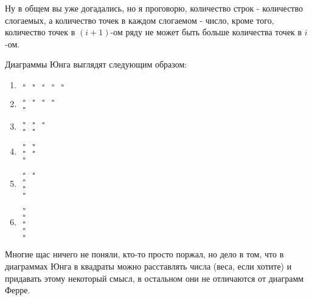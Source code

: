 Ну в общем вы уже догадались, но я проговорю, количество строк - количество слогаемых, а количество точек в каждом слогаемом - число, кроме того, количество точек в $\left(i+1\right)$-ом ряду не может быть больше количества точек в $i$-ом.

Диаграммы Юнга выглядят следующим образом:

\begin{enumerate}
\item $\begin{matrix}
	\square & \square & \square & \square & \square
	\end{matrix}$

\item $\begin{matrix}
	\square & \square & \square & \square \\
	\square
	\end{matrix}$

\item $\begin{matrix}
	\square & \square & \square \\
	\square & \square
	\end{matrix}$

\item $\begin{matrix}
	\square & \square \\
	\square & \square \\
	\square
	\end{matrix}$

\item $\begin{matrix}
	\square & \square \\
	\square \\
	\square \\
	\square
	\end{matrix}$

\item $\begin{matrix}
	\square \\
	\square \\
	\square \\
	\square \\
	\square
	\end{matrix}$
\end{enumerate}

Многие щас ничего не поняли, кто-то просто поржал, но дело в том, что в диаграммах Юнга в квадраты можно расставлять числа (веса, если хотите) и придавать этому некоторый смысл, в остальном они не отличаются от диаграмм Ферре.